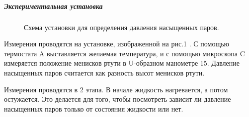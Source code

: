 \documentclass[a4paper,12pt]{article}
\begin{document}
	\subparagraph*{Экспериментальная установка}
	\begin{figure}[h!]
		\caption[]{\label{fig:1} Схема установки для определения давления насыщенных паров.}
	\end{figure}

	Измерения проводятся на установке, изображенной на рис.1 . С помощью термостата A выставляется желаемая температура, и с помощью микроскопа C измеряется положение менисков ртути в U-образном манометре 15. Давление насыщенных паров считается как разность высот менисков ртути.
	\par
	Измерения проводятся в 2 этапа. В начале жидкость нагревается, а потом остужается. Это делается для того, чтобы посмотреть зависит ли давление насыщенных паров только от состояния жидкости или нет.
	
	\newpage
	
\end{document}
